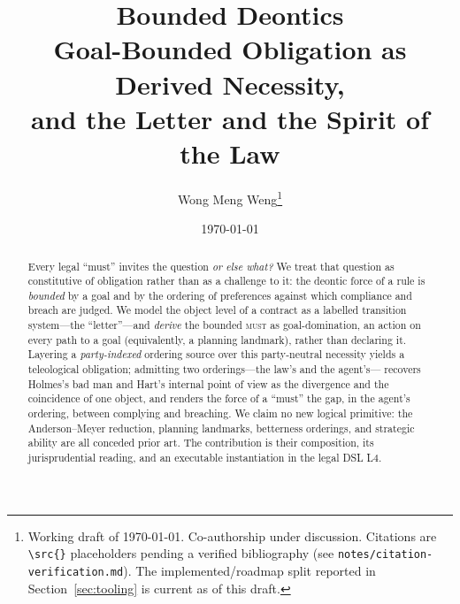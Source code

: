 \documentclass[11pt]{article}
\title{\textbf{Bounded Deontics}\\[3pt]
\large Goal-Bounded Obligation as Derived Necessity,\\ and the Letter and the Spirit of the Law}
\author{Wong Meng Weng\thanks{Working draft of \today. Co-authorship under discussion.
Citations are \texttt{\textbackslash src\{\}} placeholders pending a verified bibliography
(see \texttt{notes/citation-verification.md}). The implemented/roadmap split reported in
Section~\ref{sec:tooling} is current as of this draft.}}
\date{\today}
\newcommand{\MUST}{\textsc{must}}
\begin{document}
\maketitle

\begin{abstract}
Every legal ``must'' invites the question \emph{or else what?} We treat that question as
constitutive of obligation rather than as a challenge to it: the deontic force of a rule
is \emph{bounded} by a goal and by the ordering of preferences against which compliance
and breach are judged. We model the object level of a contract as a labelled transition
system---the ``letter''---and \emph{derive} the bounded \MUST{} as goal-domination, an
action on every path to a goal (equivalently, a planning landmark), rather than declaring
it. Layering a \emph{party-indexed} ordering source over this party-neutral necessity
yields a teleological obligation; admitting two orderings---the law's and the agent's---
recovers Holmes's bad man and Hart's internal point of view as the divergence and the
coincidence of one object, and renders the force of a ``must'' the gap, in the agent's
ordering, between complying and breaching. We claim no new logical primitive: the
Anderson--Meyer reduction, planning landmarks, betterness orderings, and strategic ability
are all conceded prior art. The contribution is their composition, its jurisprudential
reading, and an executable instantiation in the legal DSL L4.
\end{abstract}










\end{document}
